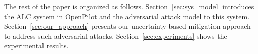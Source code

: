 \documentclass[letterpaper, 10 pt, conference]{ieeeconf}
\begin{document}





The rest of the paper is organized as follows. Section~\ref{sec:sys_model} introduces the ALC system in OpenPilot and the adversarial attack model to this system. Section~\ref{sec:our_approach} presents our uncertainty-based mitigation approach to address such adversarial attacks. Section~\ref{sec:experiments} shows the experimental results.
\end{document}
